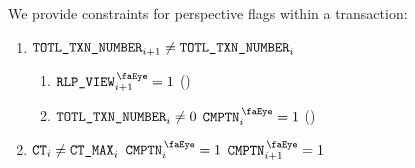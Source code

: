 We provide constraints for perspective flags within a transaction:
\begin{enumerate}
	\item \If $\texttt{TOTL}\texttt{\_}\texttt{TXN\_NUMBER} _{i + 1} \neq \texttt{TOTL}\texttt{\_}\texttt{TXN\_NUMBER} _{i}$ \Then
		\begin{enumerate}
		        \item $\isUserTxnRlpView _{i + 1} = 1$ (\sanityCheck)
		        \item \If $\texttt{TOTL}\texttt{\_}\texttt{TXN\_NUMBER} _{i} \neq 0$ \Then $\isUserTxnComputation _{i} = 1$ (\sanityCheck)
		\end{enumerate}
	\item \If $\texttt{CT} _{i} \neq \texttt{CT\_MAX} _{i}$ \et $\isUserTxnComputation _{i} = 1$ \Then  $\isUserTxnComputation _{i + 1} = 1$
\end{enumerate}
